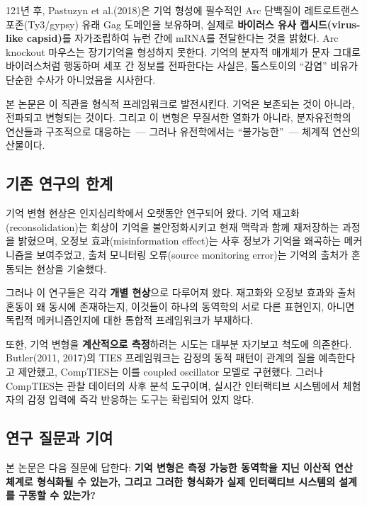 \documentclass[11pt, a4paper]{article}
\begin{document}
121년 후, Pastuzyn et al.(2018)은 기억 형성에 필수적인 Arc 단백질이 레트로트랜스포존(Ty3/gypsy) 유래 Gag 도메인을 보유하며, 실제로 \textbf{바이러스 유사 캡시드(virus-like capsid)}를 자가조립하여 뉴런 간에 mRNA를 전달한다는 것을 밝혔다\cite{pastuzyn2018}. Arc knockout 마우스는 장기기억을 형성하지 못한다\cite{plath2006}. 기억의 분자적 매개체가 문자 그대로 바이러스처럼 행동하며 세포 간 정보를 전파한다는 사실은, 톨스토이의 ``감염'' 비유가 단순한 수사가 아니었음을 시사한다.

본 논문은 이 직관을 형식적 프레임워크로 발전시킨다. 기억은 보존되는 것이 아니라, 전파되고 변형되는 것이다. 그리고 이 변형은 무질서한 열화가 아니라, 분자유전학의 연산들과 구조적으로 대응하는~--- 그러나 유전학에서는 ``불가능한''~--- 체계적 연산의 산물이다.

\subsection{기존 연구의 한계}

기억 변형 현상은 인지심리학에서 오랫동안 연구되어 왔다. 기억 재고화(reconsolidation)는 회상이 기억을 불안정화시키고 현재 맥락과 함께 재저장하는 과정을 밝혔으며\cite{nader2000,nader2003}, 오정보 효과(misinformation effect)는 사후 정보가 기억을 왜곡하는 메커니즘을 보여주었고\cite{loftus1974,loftus2005}, 출처 모니터링 오류(source monitoring error)는 기억의 출처가 혼동되는 현상을 기술했다\cite{johnson1993}.

그러나 이 연구들은 각각 \textbf{개별 현상}으로 다루어져 왔다. 재고화와 오정보 효과와 출처 혼동이 왜 동시에 존재하는지, 이것들이 하나의 동역학의 서로 다른 표현인지, 아니면 독립적 메커니즘인지에 대한 통합적 프레임워크가 부재하다.

또한, 기억 변형을 \textbf{계산적으로 측정}하려는 시도는 대부분 자기보고 척도에 의존한다. Butler(2011, 2017)의 TIES 프레임워크는 감정의 동적 패턴이 관계의 질을 예측한다고 제안했고\cite{butler2011,butler2017}, CompTIES는 이를 coupled oscillator 모델로 구현했다. 그러나 CompTIES는 관찰 데이터의 사후 분석 도구이며, 실시간 인터랙티브 시스템에서 체험자의 감정 입력에 즉각 반응하는 도구는 확립되어 있지 않다.

\subsection{연구 질문과 기여}

본 논문은 다음 질문에 답한다: \textbf{기억 변형은 측정 가능한 동역학을 지닌 이산적 연산 체계로 형식화될 수 있는가, 그리고 그러한 형식화가 실제 인터랙티브 시스템의 설계를 구동할 수 있는가?}
\end{document}
